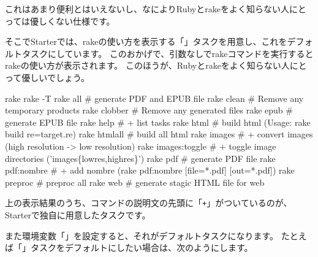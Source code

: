 これはあまり便利とはいえないし、なによりRubyとrakeをよく知らない人にとっては優しくない仕様です。

そこでStarterでは、rakeの使い方を表示する「」タスクを用意し、これをデフォルトタスクにしています。
このおかげで、引数なしでrakeコマンドを実行するとrakeの使い方が表示されます。
このほうが、Rubyとrakeをよく知らない人にとって優しいでしょう。

\label{}
\begin{starterterminal}\textdollar{} rake
rake {-}T
rake all            \# generate PDF and EPUB file
rake clean          \# Remove any temporary products
rake clobber        \# Remove any generated files
rake epub           \# generate EPUB file
rake help           \# + list tasks
rake html           \# build html (Usage: rake build re=target.re)
rake html\textunderscore{}all       \# build all html
rake images         \# + convert images (high resolution {-}\textgreater{} low resolution)
rake images:toggle  \# + toggle image directories ('images\textunderscore{}\{lowres,highres\}')
rake pdf            \# generate PDF file
rake pdf:nombre     \# + add nombre (rake pdf:nombre [file=*.pdf] [out=*.pdf])
rake preproc        \# preproc all
rake web            \# generate stagic HTML file for web\end{starterterminal}

上の表示結果のうち、コマンドの説明文の先頭に「\texttt{+}」がついているのが、Starterで独自に用意したタスクです。

また環境変数「」を設定すると、それがデフォルトタスクになります。
たとえば「」タスクをデフォルトにしたい場合は、次のようにします。

\label{}
\begin{starterterminal}\end{starterterminal}
